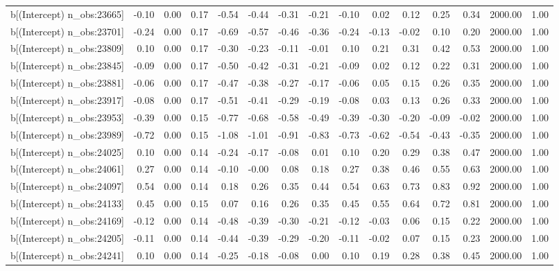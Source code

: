 \begin{table}[ht]
\begin{tabular}{rrrrrrrrrrrrrrr}
  b[(Intercept) n\_obs:23665] & -0.10 & 0.00 & 0.17 & -0.54 & -0.44 & -0.31 & -0.21 & -0.10 & 0.02 & 0.12 & 0.25 & 0.34 & 2000.00 & 1.00 \\ 
  b[(Intercept) n\_obs:23701] & -0.24 & 0.00 & 0.17 & -0.69 & -0.57 & -0.46 & -0.36 & -0.24 & -0.13 & -0.02 & 0.10 & 0.20 & 2000.00 & 1.00 \\ 
  b[(Intercept) n\_obs:23809] & 0.10 & 0.00 & 0.17 & -0.30 & -0.23 & -0.11 & -0.01 & 0.10 & 0.21 & 0.31 & 0.42 & 0.53 & 2000.00 & 1.00 \\ 
  b[(Intercept) n\_obs:23845] & -0.09 & 0.00 & 0.17 & -0.50 & -0.42 & -0.31 & -0.21 & -0.09 & 0.02 & 0.12 & 0.22 & 0.31 & 2000.00 & 1.00 \\ 
  b[(Intercept) n\_obs:23881] & -0.06 & 0.00 & 0.17 & -0.47 & -0.38 & -0.27 & -0.17 & -0.06 & 0.05 & 0.15 & 0.26 & 0.35 & 2000.00 & 1.00 \\ 
  b[(Intercept) n\_obs:23917] & -0.08 & 0.00 & 0.17 & -0.51 & -0.41 & -0.29 & -0.19 & -0.08 & 0.03 & 0.13 & 0.26 & 0.33 & 2000.00 & 1.00 \\ 
  b[(Intercept) n\_obs:23953] & -0.39 & 0.00 & 0.15 & -0.77 & -0.68 & -0.58 & -0.49 & -0.39 & -0.30 & -0.20 & -0.09 & -0.02 & 2000.00 & 1.00 \\ 
  b[(Intercept) n\_obs:23989] & -0.72 & 0.00 & 0.15 & -1.08 & -1.01 & -0.91 & -0.83 & -0.73 & -0.62 & -0.54 & -0.43 & -0.35 & 2000.00 & 1.00 \\ 
  b[(Intercept) n\_obs:24025] & 0.10 & 0.00 & 0.14 & -0.24 & -0.17 & -0.08 & 0.01 & 0.10 & 0.20 & 0.29 & 0.38 & 0.47 & 2000.00 & 1.00 \\ 
  b[(Intercept) n\_obs:24061] & 0.27 & 0.00 & 0.14 & -0.10 & -0.00 & 0.08 & 0.18 & 0.27 & 0.38 & 0.46 & 0.55 & 0.63 & 2000.00 & 1.00 \\ 
  b[(Intercept) n\_obs:24097] & 0.54 & 0.00 & 0.14 & 0.18 & 0.26 & 0.35 & 0.44 & 0.54 & 0.63 & 0.73 & 0.83 & 0.92 & 2000.00 & 1.00 \\ 
  b[(Intercept) n\_obs:24133] & 0.45 & 0.00 & 0.15 & 0.07 & 0.16 & 0.26 & 0.35 & 0.45 & 0.55 & 0.64 & 0.72 & 0.81 & 2000.00 & 1.00 \\ 
  b[(Intercept) n\_obs:24169] & -0.12 & 0.00 & 0.14 & -0.48 & -0.39 & -0.30 & -0.21 & -0.12 & -0.03 & 0.06 & 0.15 & 0.22 & 2000.00 & 1.00 \\ 
  b[(Intercept) n\_obs:24205] & -0.11 & 0.00 & 0.14 & -0.44 & -0.39 & -0.29 & -0.20 & -0.11 & -0.02 & 0.07 & 0.15 & 0.23 & 2000.00 & 1.00 \\ 
  b[(Intercept) n\_obs:24241] & 0.10 & 0.00 & 0.14 & -0.25 & -0.18 & -0.08 & 0.00 & 0.10 & 0.19 & 0.28 & 0.38 & 0.45 & 2000.00 & 1.00 \\ 

\end{tabular}
\end{table}
